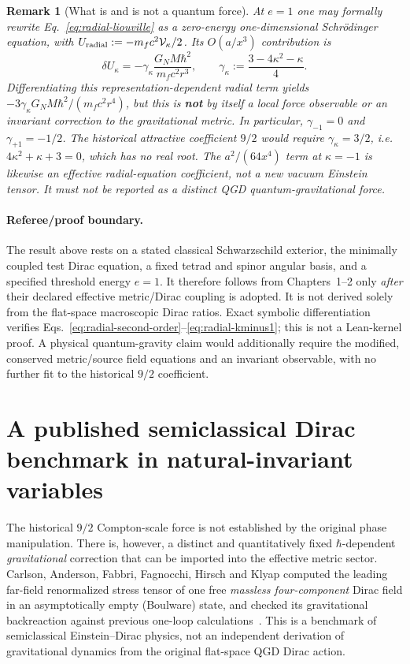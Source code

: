 \documentclass[11pt,a4paper]{article}
\newtheorem{remark}[theorem]{Remark}
\begin{document}
\begin{remark}[What is and is not a quantum force]
\label{rem:radial-not-force}
At $e=1$ one may \emph{formally} rewrite
Eq.~\eqref{eq:radial-liouville} as a zero-energy one-dimensional
Schr\"odinger equation, with
$U_{\rm radial}:=-m_fc^2\mathcal V_\kappa/2$.
Its $O(a/x^3)$ contribution is
\begin{equation}\label{eq:radial-gamma}
\delta U_\kappa=-\gamma_\kappa
\frac{G_NM\hbar^2}{m_fc^2r^3},\qquad
\gamma_\kappa:=\frac{3-4\kappa^2-\kappa}{4}.
\end{equation}
Differentiating this \emph{representation-dependent radial term} yields
$-3\gamma_\kappa G_NM\hbar^2/(m_fc^2r^4)$, but this is
\textbf{not} by itself a local force observable or an invariant
correction to the gravitational metric. In particular,
$\gamma_{-1}=0$ and $\gamma_{+1}=-1/2$. The historical 
\emph{attractive} coefficient $9/2$ would require
$\gamma_\kappa=3/2$, i.e.
$4\kappa^2+\kappa+3=0$, which has no real root.
The $a^2/(64x^4)$ term at $\kappa=-1$ is likewise an
\emph{effective radial-equation coefficient}, not a new vacuum
Einstein tensor. It must not be reported as a distinct QGD
quantum-gravitational force.
\end{remark}
\paragraph{Referee/proof boundary.}
The result above rests on a stated classical Schwarzschild exterior,
the minimally coupled test Dirac equation, a fixed tetrad and spinor
angular basis, and a specified threshold energy $e=1$. It therefore
follows from Chapters~1--2 only \emph{after} their declared effective
metric/Dirac coupling is adopted. It is not derived solely from the
flat-space macroscopic Dirac ratios. Exact symbolic differentiation
verifies Eqs.~\eqref{eq:radial-second-order}--\eqref{eq:radial-kminus1};
this is not a Lean-kernel proof. A physical quantum-gravity claim
would additionally require the modified, conserved metric/source
field equations and an invariant observable, with no further fit
to the historical $9/2$ coefficient.


\section{A published semiclassical Dirac benchmark in natural-invariant variables}
\label{sec:diracbenchmark}
The historical $9/2$ Compton-scale force is not established by the
original phase manipulation.  There is, however, a distinct and
quantitatively fixed $\hbar$-dependent \emph{gravitational} correction
that can be imported into the effective metric sector.  Carlson,
Anderson, Fabbri, Fagnocchi, Hirsch and Klyap computed the leading
far-field renormalized stress tensor of one free \emph{massless
four-component} Dirac field in an asymptotically empty (Boulware)
state, and checked its gravitational backreaction against previous
one-loop calculations~\cite{Carlson2010}.  This is a benchmark of
semiclassical Einstein--Dirac physics, not an independent derivation
of gravitational dynamics from the original flat-space QGD Dirac action.
\end{document}
